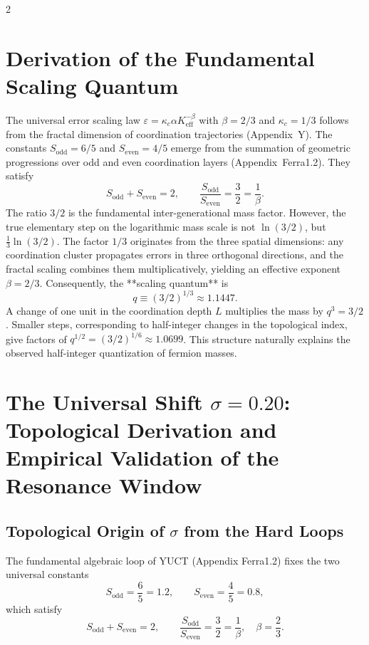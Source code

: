 \documentclass[11pt,a4paper]{article}
\newcommand{\Sodd}{S_{\mathrm{odd}}}
\newcommand{\Seven}{S_{\mathrm{even}}}
\begin{document}
\begin{multicols}{2}
		\section{Derivation of the Fundamental Scaling Quantum}
		\label{sec:derivation}
		
		The universal error scaling law \(\varepsilon = \kappa_c \alpha K_{\mathrm{eff}}^{-\beta}\) with \(\beta = 2/3\) and \(\kappa_c = 1/3\) follows from the fractal dimension of coordination trajectories (Appendix~Y). The constants \(\Sodd = 6/5\) and \(\Seven = 4/5\) emerge from the summation of geometric progressions over odd and even coordination layers (Appendix~Ferra1.2). They satisfy
		\[
		\Sodd + \Seven = 2, \qquad \frac{\Sodd}{\Seven} = \frac{3}{2} = \frac{1}{\beta}.
		\]
		The ratio \(3/2\) is the fundamental inter-generational mass factor. However, the true elementary step on the logarithmic mass scale is not \(\ln(3/2)\), but \(\frac{1}{3}\ln(3/2)\). The factor \(1/3\) originates from the three spatial dimensions: any coordination cluster propagates errors in three orthogonal directions, and the fractal scaling combines them multiplicatively, yielding an effective exponent \(\beta = 2/3\). Consequently, the **scaling quantum** is
		\begin{equation}
			q \equiv (3/2)^{1/3} \approx 1.1447.
		\end{equation}
		A change of one unit in the coordination depth \(L\) multiplies the mass by \(q^3 = 3/2\). Smaller steps, corresponding to half-integer changes in the topological index, give factors of \(q^{1/2} = (3/2)^{1/6} \approx 1.0699\). This structure naturally explains the observed half-integer quantization of fermion masses.
		
\section{The Universal Shift \(\sigma = 0.20\): Topological Derivation and Empirical Validation of the Resonance Window}
\label{sec:sigma}

\subsection{Topological Origin of \(\sigma\) from the Hard Loops}

The fundamental algebraic loop of YUCT (Appendix Ferra1.2) fixes the two universal constants
\[
S_{\mathrm{odd}} = \frac{6}{5} = 1.2,\qquad S_{\mathrm{even}} = \frac{4}{5} = 0.8,
\]
which satisfy
\[
S_{\mathrm{odd}} + S_{\mathrm{even}} = 2,\qquad \frac{S_{\mathrm{odd}}}{S_{\mathrm{even}}} = \frac{3}{2} = \frac{1}{\beta},\quad \beta = \frac{2}{3}.
\]


\end{multicols}
\end{document}

